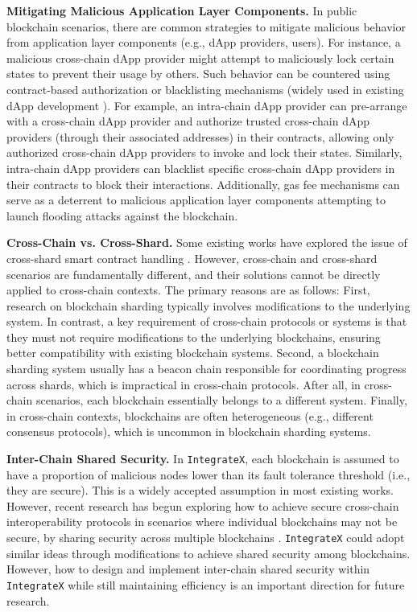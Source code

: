 \vspace{3pt}
\noindent
\textbf{Mitigating Malicious Application Layer Components.}
In public blockchain scenarios, there are common strategies to mitigate malicious behavior from application layer components (e.g., dApp providers, users). 
For instance, a malicious cross-chain dApp provider might attempt to maliciously lock certain states to prevent their usage by others. 
Such behavior can be countered using contract-based authorization or blacklisting mechanisms (widely used in existing dApp development \cite{etherscan}). 
For example, an intra-chain dApp provider can pre-arrange with a cross-chain dApp provider and authorize trusted cross-chain dApp providers (through their associated addresses) in their contracts, allowing only authorized cross-chain dApp providers to invoke and lock their states. 
Similarly, intra-chain dApp providers can blacklist specific cross-chain dApp providers in their contracts to block their interactions.
Additionally, gas fee mechanisms can serve as a deterrent to malicious application layer components attempting to launch flooding attacks against the blockchain.

\vspace{3pt}
\noindent
\textbf{Cross-Chain vs. Cross-Shard.}
Some existing works have explored the issue of cross-shard smart contract handling \cite{qi2024lightcross, li2022jenga}. 
However, cross-chain and cross-shard scenarios are fundamentally different, and their solutions cannot be directly applied to cross-chain contexts. 
The primary reasons are as follows: First, research on blockchain sharding typically involves modifications to the underlying system. 
In contrast, a key requirement of cross-chain protocols or systems is that they must not require modifications to the underlying blockchains, ensuring better compatibility with existing blockchain systems. 
Second, a blockchain sharding system usually has a beacon chain responsible for coordinating progress across shards, which is impractical in cross-chain protocols. 
After all, in cross-chain scenarios, each blockchain essentially belongs to a different system. 
Finally, in cross-chain contexts, blockchains are often heterogeneous (e.g., different consensus protocols), which is uncommon in blockchain sharding systems.

\vspace{3pt}
\noindent
\textbf{Inter-Chain Shared Security.}
In \texttt{IntegrateX}, each blockchain is assumed to have a proportion of malicious nodes lower than its fault tolerance threshold (i.e., they are secure). 
This is a widely accepted assumption in most existing works. 
However, recent research has begun exploring how to achieve secure cross-chain interoperability protocols in scenarios where individual blockchains may not be secure, by sharing security across multiple blockchains \cite{sheng2023trustboost}.
\texttt{IntegrateX} could adopt similar ideas through modifications to achieve shared security among blockchains. 
However, how to design and implement inter-chain shared security within \texttt{IntegrateX} while still maintaining efficiency is an important direction for future research.
